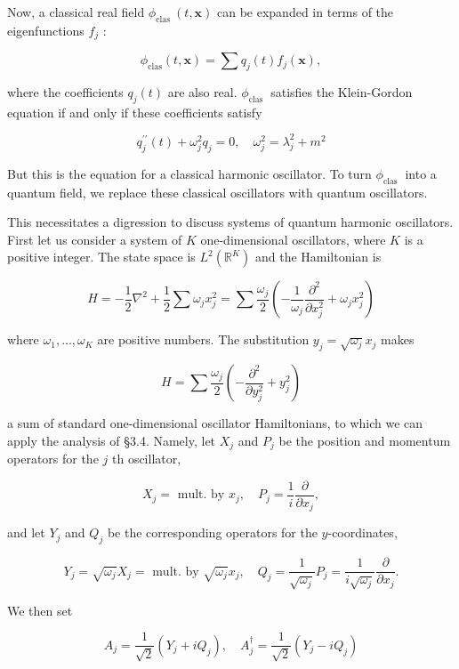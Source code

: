 \documentclass[10pt, letterpaper]{article}
\begin{document}
Now, a classical real field $\phi_{\text {clas }}(t, \mathbf{x})$ can be expanded in terms of the eigenfunctions $f_{j}$ :

$$
\phi_{\mathrm{clas}}(t, \mathbf{x})=\sum q_{j}(t) f_{j}(\mathbf{x}),
$$

where the coefficients $q_{j}(t)$ are also real. $\phi_{\text {clas }}$ satisfies the Klein-Gordon equation if and only if these coefficients satisfy

$$
q_{j}^{\prime \prime}(t)+\omega_{j}^{2} q_{j}=0, \quad \omega_{j}^{2}=\lambda_{j}^{2}+m^{2}
$$

But this is the equation for a classical harmonic oscillator. To turn $\phi_{\text {clas }}$ into a quantum field, we replace these classical oscillators with quantum oscillators.

This necessitates a digression to discuss systems of quantum harmonic oscillators. First let us consider a system of $K$ one-dimensional oscillators, where $K$ is a positive integer. The state space is $L^{2}\left(\mathbb{R}^{K}\right)$ and the Hamiltonian is

$$
H=-\frac{1}{2} \nabla^{2}+\frac{1}{2} \sum \omega_{j} x_{j}^{2}=\sum \frac{\omega_{j}}{2}\left(-\frac{1}{\omega_{j}} \frac{\partial^{2}}{\partial x_{j}^{2}}+\omega_{j} x_{j}^{2}\right)
$$

where $\omega_{1}, \ldots, \omega_{K}$ are positive numbers. The substitution $y_{j}=\sqrt{\omega_{j}} x_{j}$ makes

$$
H=\sum \frac{\omega_{j}}{2}\left(-\frac{\partial^{2}}{\partial y_{j}^{2}}+y_{j}^{2}\right)
$$

a sum of standard one-dimensional oscillator Hamiltonians, to which we can apply the analysis of §3.4. Namely, let $X_{j}$ and $P_{j}$ be the position and momentum\\
operators for the $j$ th oscillator,

$$
X_{j}=\text { mult. by } x_{j}, \quad P_{j}=\frac{1}{i} \frac{\partial}{\partial x_{j}},
$$

and let $Y_{j}$ and $Q_{j}$ be the corresponding operators for the $y$-coordinates,

$$
Y_{j}=\sqrt{\omega_{j}} X_{j}=\text { mult. by } \sqrt{\omega_{j}} x_{j}, \quad Q_{j}=\frac{1}{\sqrt{\omega_{j}}} P_{j}=\frac{1}{i \sqrt{\omega_{j}}} \frac{\partial}{\partial x_{j}} .
$$

We then set

$$
A_{j}=\frac{1}{\sqrt{2}}\left(Y_{j}+i Q_{j}\right), \quad A_{j}^{\dagger}=\frac{1}{\sqrt{2}}\left(Y_{j}-i Q_{j}\right)
$$
\end{document}
